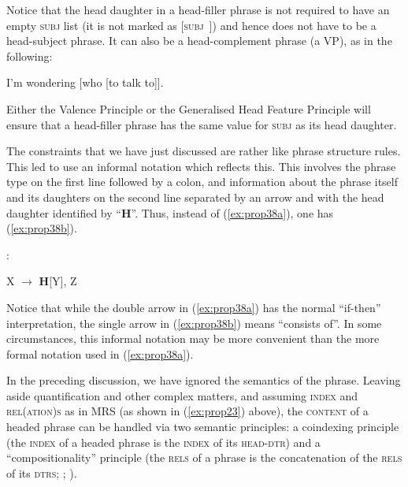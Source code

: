 \documentclass[output=paper,biblatex,babelshorthands,newtxmath,draftmode,colorlinks,citecolor=brown]{langscibook}
\begin{document}
Notice that the head daughter in a head-filler phrase is not required to have an empty \textsc{subj} list (it is not marked as [\textsc{subj}~\eliste]) and hence does not have to be a head-subject phrase. It can also be a head-complement phrase (a VP), as in the following:

\ea\label{ex:prop37}
I’m wondering [who [to talk to]].
\z

\noindent
Either the Valence Principle or the Generalised Head Feature Principle will ensure that a head-filler phrase has the same value for \textsc{subj} as its head daughter.

The constraints that we have just discussed are rather like phrase structure rules. This led
\citet[33]{GSag2000a-u} to use an informal notation which reflects this. This involves the phrase
type on the first line followed by a colon, and information about the phrase itself and its
daughters on the second line separated by an arrow and with the head daughter identified by
``\textbf{H}''. Thus, instead of (\ref{ex:prop38a}), one has (\ref{ex:prop38b}). 

\eal\label{ex:prop38}
\ex\label{ex:prop38a}
 \impl
{}
\ex\label{ex:prop38b}
:
	
X $\to$ \textbf{H}[Y], Z
\zl

\noindent
Notice that while the double arrow in (\ref{ex:prop38a}) has the normal ``if-then'' interpretation, the single arrow in (\ref{ex:prop38b}) means ``consists of''. In some circumstances, this informal notation may be more convenient than the more formal notation used in (\ref{ex:prop38a}).

\largerpage
In the preceding discussion, we have ignored the semantics of the phrase. 
Leaving aside quantification and other complex matters, and assuming \textsc{index} and
\textsc{rel(ation)s} as in MRS (as shown in (\ref{ex:prop23}) above), the \textsc{content} of a
headed phrase can be handled via two semantic principles: a coindexing principle (the \textsc{index}
of a headed phrase is the \textsc{index} of its \textsc{head-dtr}) and a ``compositionality'' principle (the \textsc{rels} of
a phrase is the concatenation of the \textsc{rels} of its \textsc{dtrs}; \citealp[Section~4.3.2,
Section~5]{CFPS2005a}; ).
\end{document}
